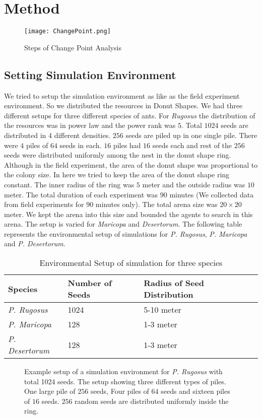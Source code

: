 \chapter{Method}
\begin{figure}[h]
	\texttt{[image: ChangePoint.png]}
	\caption{Steps of Change Point Analysis}
\end{figure}
\section{\label{section:Setting Simulation Environment}Setting Simulation Environment}
We tried to setup the simulation environment as like as the field experiment environment. So we distributed the resources in Donut Shapes. We had three different setups for three different species of ants. For \textit{Rugosus} the distribution of the resources was in power law and the power rank was $5$. Total $1024$ seeds are distributed in 4 different densities. $256$ seeds are piled up in one single pile. There were $4$ piles of $64$ seeds in each. $16$ piles had $16$ seeds each and rest of the $256$ seeds were distributed uniformly among the nest in the donut shape ring. Although in the field experiment, the area of the donut shape was proportional to the colony size. In here we tried to keep the area of the donut shape ring constant. The inner radius of the ring was $5$ meter and the outside radius was $10$ meter. The total duration of each experiment was $90$ minutes (We collected data from field experiments for $90$ minutes only). The total arena size was $20\times20$ meter. We kept the arena into this size and bounded the agents to search in this arena.  The setup is varied for \textit{Maricopa} and \textit{Desertorum}. The following table represents the environmental setup of simulations for \textit{P. Rugosus}, \textit{P. Maricopa} and \textit{P. Desertorum}.
\begin{table}
	\begin{tabular}{ |p{}|p{}|p{}| } 
		\hline
		\textbf{Species} & \textbf{Number of Seeds} & \textbf{Radius of Seed Distribution} \\
		\hline 
		\textit{P. Rugosus} & 1024 & 5-10 meter\\ 
		\hline
		\textit{P. Maricopa} & 128 & 1-3 meter\\ 
		\hline
		 \textit{P. Desertorum} & 128 & 1-3 meter\\
		\hline
	\end{tabular}
	\caption{Environmental Setup of simulation for three species}
\end{table}
\begin{figure}[!h]
	\caption{Example setup of a simulation environment for \textit{P. Rugosus} with total 1024 seeds. The setup showing three different types of piles. One large pile of $256$ seeds, Four piles of $64$ seeds and sixteen piles of $16$ seeds. $256$ random seeds are distributed uniformly inside the ring. }
\end{figure}
